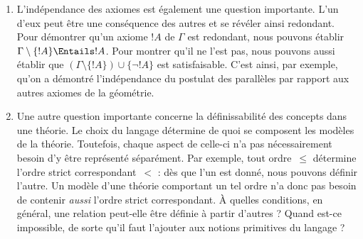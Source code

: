 \documentclass[../../../include/open-logic-section]{subfiles}
\begin{document}
\begin{explain}
\begin{enumerate}
  un modèle de~$\Gamma$. S'il existe des modèles de notre théorie,
  nous pouvons aussi les étudier et en construire à l'aide de
  méthodes logiques.
\item L'indépendance des axiomes est également une question
  importante. L'un d'eux peut être une conséquence des autres et se
  révéler ainsi redondant. Pour démontrer qu'un axiome $!A$ de
  $\Gamma$ est redondant, nous pouvons établir
  $\Gamma \setminus \{!A\} \Entails !A$. Pour montrer qu'il ne
  l'est pas, nous pouvons aussi établir que
  $(\Gamma \setminus \{!A\}) \cup \{\lnot !A\}$ est satisfaisable.
  C'est ainsi, par exemple, qu'on a démontré l'indépendance du
  postulat des parallèles par rapport aux autres axiomes de la
  géométrie.
\item Une autre question importante concerne la définissabilité
  des concepts dans une théorie. Le choix du langage détermine de
  quoi se composent les modèles de la théorie. Toutefois, chaque
  aspect de celle-ci n'a pas nécessairement besoin d'y être
  représenté séparément. Par exemple, tout ordre~$\le$ détermine
  l'ordre strict correspondant~$<$ : dès que l'un est donné, nous
  pouvons définir l'autre. Un modèle d'une théorie comportant un
  tel ordre n'a donc pas besoin de contenir \emph{aussi} l'ordre
  strict correspondant. À quelles conditions, en général, une
  relation peut-elle être définie à partir d'autres ? Quand est-ce
  impossible, de sorte qu'il faut l'ajouter aux notions primitives
  du langage ?
\end{enumerate}
\end{explain}
\end{document}
